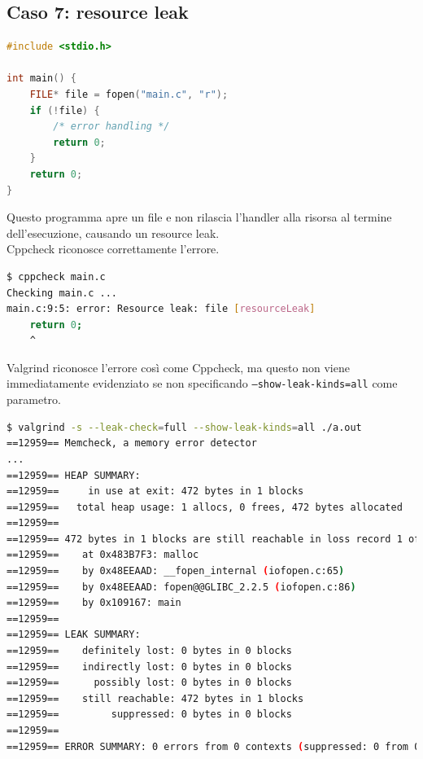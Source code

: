 \documentclass{article}
\begin{document}
\newpage
\subsection{Caso 7: resource leak}
\label{sec:caso7}

\begin{lstlisting}[language=c]
#include <stdio.h>

int main() {
    FILE* file = fopen("main.c", "r");
    if (!file) {
        /* error handling */
        return 0;
    }
    return 0;
}
\end{lstlisting}

Questo programma apre un file e non rilascia l'handler alla risorsa al termine dell'esecuzione, causando un
resource leak. \\

Cppcheck riconosce correttamente l'errore.

\begin{lstlisting}[language=bash]
$ cppcheck main.c 
Checking main.c ...
main.c:9:5: error: Resource leak: file [resourceLeak]
    return 0;
    ^
\end{lstlisting}

Valgrind riconosce l'errore così come Cppcheck, ma questo non viene
immediatamente evidenziato se non specificando \texttt{--show-leak-kinds=all}
come parametro.

\begin{lstlisting}[language=bash]
$ valgrind -s --leak-check=full --show-leak-kinds=all ./a.out 
==12959== Memcheck, a memory error detector
...
==12959== HEAP SUMMARY:
==12959==     in use at exit: 472 bytes in 1 blocks
==12959==   total heap usage: 1 allocs, 0 frees, 472 bytes allocated
==12959== 
==12959== 472 bytes in 1 blocks are still reachable in loss record 1 of 1
==12959==    at 0x483B7F3: malloc 
==12959==    by 0x48EEAAD: __fopen_internal (iofopen.c:65)
==12959==    by 0x48EEAAD: fopen@@GLIBC_2.2.5 (iofopen.c:86)
==12959==    by 0x109167: main 
==12959== 
==12959== LEAK SUMMARY:
==12959==    definitely lost: 0 bytes in 0 blocks
==12959==    indirectly lost: 0 bytes in 0 blocks
==12959==      possibly lost: 0 bytes in 0 blocks
==12959==    still reachable: 472 bytes in 1 blocks
==12959==         suppressed: 0 bytes in 0 blocks
==12959== 
==12959== ERROR SUMMARY: 0 errors from 0 contexts (suppressed: 0 from 0)
\end{lstlisting}

\end{document}
